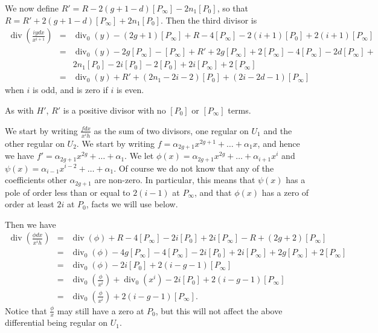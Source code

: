 \documentclass[draft, 11pt]{article} %
\theoremstyle{plain}
\theoremstyle{remark}
\DeclareMathOperator{\di}{div}
\begin{document}
We now define $R' = R - 2(g+1-d)[P_\infty] - 2n_1[P_0]$, so that $R = R' + 2(g+1-d)[P_\infty] + 2n_1[P_0]$.
Then the third divisor is
\begin{eqnarray*}
\di \left( \frac{iydx}{x^{i+1}} \right) & = & \di_0(y) - (2g+1)[P_\infty] + R - 4[P_\infty] - 2(i+1)[P_0] + 2(i+1)[P_\infty] \\
& = & \di_0(y) - 2g[P_\infty] - [P_\infty] + R' + 2g[P_\infty] + 2[P_\infty] - 4[P_\infty] - 2d[P_\infty] +\\
& &  2n_1[P_0] - 2i[P_0] -2[P_0] + 2i[P_\infty] +2[P_\infty]  \\
& = & \di_0(y) + R' + (2n_1 - 2i -2)[P_0] + (2i -2d -1)[P_\infty]
\end{eqnarray*}
when $i$ is odd, and is zero if $i$ is even.

As with $H'$, $R'$ is a positive divisor with no $[P_0]$ or $[P_\infty]$ terms.



We start by writing $\frac{fdx}{x^ih}$ as the sum of two divisors, one regular on $U_1$ and the other regular on $U_2$.
We start by writing $f = \alpha_{2g+1} x^{2g+1} + \ldots + \alpha_1x$, and hence we have $f' = \alpha_{2g+1}x^{2g} + \ldots + \alpha_1$.
We let $\phi (x) = \alpha_{2g+1}x^{2g} + \ldots + \alpha_{i+1}x^i$ and $\psi (x) = \alpha_{i-1}x^{i-2} + \ldots + \alpha_1$.
Of course we do not know that any of the coefficients other $\alpha_{2g+1}$ are non-zero.
In particular, this means that $\psi(x)$ has a pole of order less than or equal to $2(i-1)$ at $P_\infty$, and that $\phi(x)$ has a zero of order at least $2i$ at $P_0$, facts we will use below.

Then we have
\begin{eqnarray*}
\di \left( \frac{\phi dx}{x^i h} \right) & = & \di(\phi) + R - 4[P_\infty] - 2i[P_0] + 2i[P_\infty] - R + (2g+2) [P_\infty] \\
& = & \di_0(\phi) - 4g[P_\infty] - 4[P_\infty] - 2i[P_0] + 2i[P_\infty] + 2g[P_\infty] + 2[P_\infty] \\
& = & \di_0(\phi) - 2i[P_0] + 2(i-g-1)[P_\infty] \\
& = & \di_0\left( \frac{\phi}{x^i} \right) + \di_0( x^i) - 2i[P_0] + 2(i-g-1)[P_\infty] \\
& = & \di_0 \left( \frac{\phi}{x^i} \right) + 2(i-g-1)[P_\infty].
\end{eqnarray*}
Notice that $\frac{\phi}{x}$ may still have a zero at $P_0$, but this will not affect the above differential being regular on $U_1$.
\end{document}
